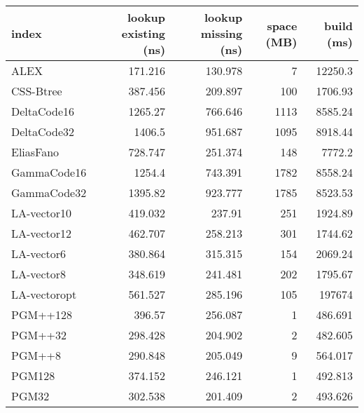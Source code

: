 \begin{tabular}{lrrrr}
\hline
 index             &   lookup existing (ns) &   lookup missing (ns) &   space (MB) &       build (ms) \\
\hline
 ALEX              &                171.216 &              130.978  &            7 &  12250.3         \\
 CSS-Btree         &                387.456 &              209.897  &          100 &   1706.93        \\
 DeltaCode16       &               1265.27  &              766.646  &         1113 &   8585.24        \\
 DeltaCode32       &               1406.5   &              951.687  &         1095 &   8918.44        \\
 EliasFano         &                728.747 &              251.374  &          148 &   7772.2         \\
 GammaCode16       &               1254.4   &              743.391  &         1782 &   8558.24        \\
 GammaCode32       &               1395.82  &              923.777  &         1785 &   8523.53        \\
 LA-vector10       &                419.032 &              237.91   &          251 &   1924.89        \\
 LA-vector12       &                462.707 &              258.213  &          301 &   1744.62        \\
 LA-vector6        &                380.864 &              315.315  &          154 &   2069.24        \\
 LA-vector8        &                348.619 &              241.481  &          202 &   1795.67        \\
 LA-vectoropt      &                561.527 &              285.196  &          105 & 197674           \\
 PGM++128          &                396.57  &              256.087  &            1 &    486.691       \\
 PGM++32           &                298.428 &              204.902  &            2 &    482.605       \\
 PGM++8            &                290.848 &              205.049  &            9 &    564.017       \\
 PGM128            &                374.152 &              246.121  &            1 &    492.813       \\
 PGM32             &                302.538 &              201.409  &            2 &    493.626       \\

\end{tabular}
